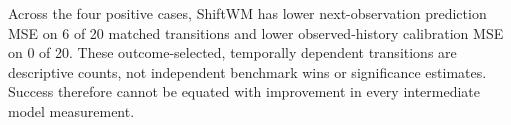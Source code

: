 Across the four positive cases, ShiftWM has lower next-observation prediction MSE on 6 of 20 matched transitions and lower observed-history calibration MSE on 0 of 20. These outcome-selected, temporally dependent transitions are descriptive counts, not independent benchmark wins or significance estimates. Success therefore cannot be equated with improvement in every intermediate model measurement.
